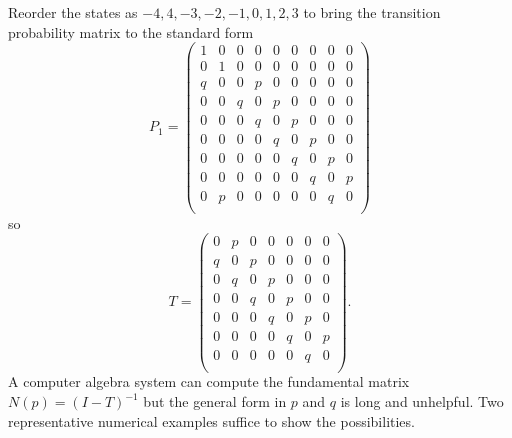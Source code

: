 \documentclass[12pt]{article}
\begin{document}
\begin{example}
    Reorder the states as \( -4, 4, -3, -2, -1, 0, 1, 2, 3 \) to bring
    the transition probability matrix to the standard form
    \[
        P_{1} =
        \begin{pmatrix}
            1 & 0 & 0 & 0 & 0 & 0 & 0 & 0 & 0 \\
            0 & 1 & 0 & 0 & 0 & 0 & 0 & 0 & 0 \\
            q & 0 & 0 & p & 0 & 0 & 0 & 0 & 0 \\
            0 & 0 & q & 0 & p & 0 & 0 & 0 & 0 \\
            0 & 0 & 0 & q & 0 & p & 0 & 0 & 0 \\
            0 & 0 & 0 & 0 & q & 0 & p & 0 & 0 \\
            0 & 0 & 0 & 0 & 0 & q & 0 & p & 0 \\
            0 & 0 & 0 & 0 & 0 & 0 & q & 0 & p \\
            0 & p & 0 & 0 & 0 & 0 & 0 & q & 0 \\
        \end{pmatrix}
    \] so
    \[
        T =
        \begin{pmatrix}
            0 & p & 0 & 0 & 0 & 0 & 0 \\
            q & 0 & p & 0 & 0 & 0 & 0 \\
            0 & q & 0 & p & 0 & 0 & 0 \\
            0 & 0 & q & 0 & p & 0 & 0 \\
            0 & 0 & 0 & q & 0 & p & 0 \\
            0 & 0 & 0 & 0 & q & 0 & p \\
            0 & 0 & 0 & 0 & 0 & q & 0 \\
        \end{pmatrix}
        .
    \] A computer algebra system can compute
    the fundamental matrix \( N(p) = (I-T)^{-1} \) but the general form
    in \( p \) and \( q \) is long and unhelpful. Two representative
    numerical examples suffice to show the possibilities.


\end{example}
\end{document}

